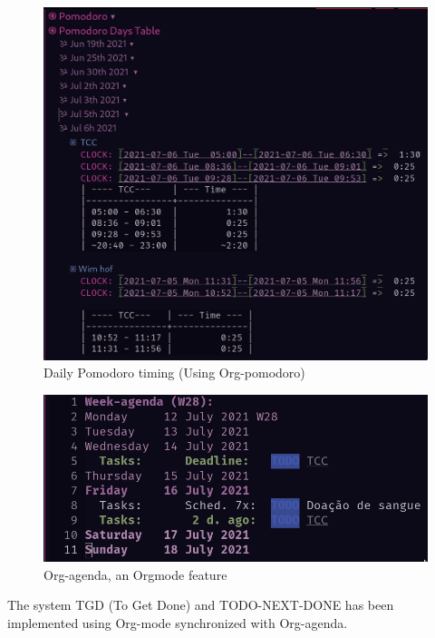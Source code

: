 \documentclass[
12pt,				%
openright,			%
oneside,			%
a4paper,			%
brazil,				%
english,			  %
]{abntex2}
\begin{document}

\begin{figure}[ht]
  \centering
  \caption{\label{fig:org-pomodoro} Daily Pomodoro timing (Using Org-pomodoro)}
  \includegraphics[width=0.4\linewidth]{Imagens/daily-pomodoro.png}
\end{figure}

\begin{figure}[ht]
  \centering
  \caption{\label{fig:org-agenda} Org-agenda, an Orgmode feature}
  \includegraphics[width=0.7\linewidth]{Imagens/weekly-agenda.png}
\end{figure}

The system TGD (To Get Done) and TODO-NEXT-DONE has been implemented
using Org-mode synchronized with Org-agenda.


\end{document}
